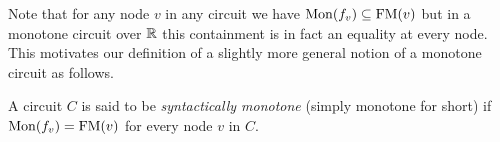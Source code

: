 \noindent Note that for any node $v$ in any circuit we have $\mathrm{Mon}(f_{v}) \subseteq \mathrm{FM}(v)$ but in a monotone circuit over $\mathbb{R}$ this containment is in fact an equality at every node. 
This motivates our definition of a slightly more general notion of a monotone circuit as follows.

\begin{definition}\label{defn:monotone-circuit}
  A circuit $C$ is said to be \emph{syntactically monotone} (simply monotone for short) if $\mathrm{Mon}(f_{v}) = \mathrm{FM}(v)$ for every node $v$ in $C$.
\end{definition}
